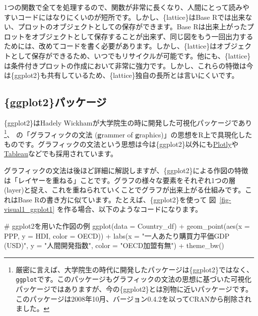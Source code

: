 \documentclass[
  a4paper,
  pandoc,
  ja=standard,
  jafont=haranoaji]{bxjsbook}
\newenvironment{Shaded}{\begin{snugshade}}{\end{snugshade}}
\newcommand{\AttributeTok}[1]{\textcolor[rgb]{0.00,0.48,0.65}{#1}}
\newcommand{\CommentTok}[1]{\textcolor[rgb]{0.37,0.37,0.37}{#1}}
\newcommand{\FunctionTok}[1]{\textcolor[rgb]{0.28,0.35,0.67}{#1}}
\newcommand{\NormalTok}[1]{\textcolor[rgb]{0.00,0.48,0.65}{#1}}
\newcommand{\SpecialCharTok}[1]{\textcolor[rgb]{0.37,0.37,0.37}{#1}}
\newcommand{\StringTok}[1]{\textcolor[rgb]{0.13,0.47,0.30}{#1}}
\begin{document}
1つの関数で全てを処理するので、関数が非常に長くなり、人間にとって読みやすいコードにはなりにくいのが短所です。しかし、\{lattice\}はBase
Rでは出来ない、プロットのオブジェクトとしての保存ができます。Base
Rは出来上がったプロットをオブジェクトとして保存することが出来ず、同じ図をもう一回出力するためには、改めてコードを書く必要があります。しかし、\{lattice\}はオブジェクトとして保存ができるため、いつでもリサイクルが可能です。他にも、\{lattice\}は条件付きプロットの作成において非常に強力です。しかし、これらの特徴は今は\{ggplot2\}も共有しているため、\{lattice\}独自の長所とは言いにくいです。

\hypertarget{ggplot2ux30d1ux30c3ux30b1ux30fcux30b8}{%
\subsection{\{ggplot2\}パッケージ}\label{ggplot2ux30d1ux30c3ux30b1ux30fcux30b8}}

\{ggplot2\}はHadely
Wickhamが大学院生の時に開発した可視化パッケージであり\footnote{厳密に言えば、大学院生の時代に開発したパッケージは\{ggplot2\}ではなく、\texttt{ggplot}です。このパッケージもグラフィックの文法の思想に基づいた可視化パッケージではありますが、今の\{ggplot2\}とは別物に近いパッケージです。このパッケージは2008年10月、バージョン0.4.2を以ってCRANから削除されました。}、
\citet{Wilkinson:2005} の「グラフィックの文法 (\textbf{g}rammer of
\textbf{g}raphics)」の思想をR上で具現化したものです。グラフィックの文法という思想は今は\{ggplot2\}以外にも\href{https://plotly.com}{Plotly}や\href{https://www.tableau.com/}{Tableau}などでも採用されています。

グラフィックの文法は後ほど詳細に解説しますが、\{ggplot2\}による作図の特徴は「レイヤーを重ねる」ことです。グラフの様々な要素をそれぞれ1つの層
(layer)と捉え、これを重ねられていくことでグラフが出来上がる仕組みです。これはBase
Rの書き方に似ています。たとえば、\{ggplot2\}を使って
図~\ref{fig-visual1_ggplot1} を作る場合、以下のようなコードになります。

\begin{Shaded}
\begin{Highlighting}[numbers=left,,]
\CommentTok{\# ggplot2を用いた作図の例}
\FunctionTok{ggplot}\NormalTok{(}\AttributeTok{data =}\NormalTok{ Country\_df) }\SpecialCharTok{+}
  \FunctionTok{geom\_point}\NormalTok{(}\FunctionTok{aes}\NormalTok{(}\AttributeTok{x =}\NormalTok{ PPP, }\AttributeTok{y =}\NormalTok{ HDI, }\AttributeTok{color =}\NormalTok{ OECD)) }\SpecialCharTok{+}
  \FunctionTok{labs}\NormalTok{(}\AttributeTok{x =} \StringTok{"一人あたり購買力平価GDP (USD)"}\NormalTok{, }\AttributeTok{y =} \StringTok{"人間開発指数"}\NormalTok{,}
       \AttributeTok{color =} \StringTok{"OECD加盟有無"}\NormalTok{) }\SpecialCharTok{+}
  \FunctionTok{theme\_bw}\NormalTok{()}
\end{Highlighting}
\end{Shaded}
\end{document}
